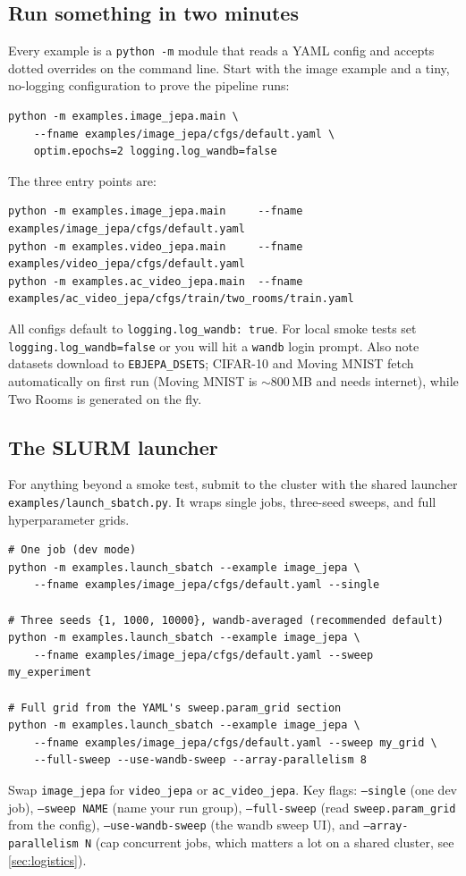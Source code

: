 \documentclass{article}
\newcommand{\code}[1]{\texttt{\small #1}}
\newcommand{\file}[1]{\texttt{\small #1}}
\begin{document}
\subsection{Run something in two minutes}

Every example is a \code{python -m} module that reads a YAML config and accepts
dotted overrides on the command line. Start with the image example and a tiny,
no-logging configuration to prove the pipeline runs:
\begin{lstlisting}[style=bash]
python -m examples.image_jepa.main \
    --fname examples/image_jepa/cfgs/default.yaml \
    optim.epochs=2 logging.log_wandb=false
\end{lstlisting}
The three entry points are:
\begin{lstlisting}[style=bash]
python -m examples.image_jepa.main     --fname examples/image_jepa/cfgs/default.yaml
python -m examples.video_jepa.main     --fname examples/video_jepa/cfgs/default.yaml
python -m examples.ac_video_jepa.main  --fname examples/ac_video_jepa/cfgs/train/two_rooms/train.yaml
\end{lstlisting}

\begin{gotchabox}
All configs default to \code{logging.log\_wandb: true}. For local smoke tests set
\code{logging.log\_wandb=false} or you will hit a \code{wandb} login prompt. Also
note datasets download to \code{EBJEPA\_DSETS}; CIFAR-10 and Moving MNIST fetch
automatically on first run (Moving MNIST is $\sim$800\,MB and needs internet),
while Two Rooms is generated on the fly.
\end{gotchabox}

\subsection{The SLURM launcher}

For anything beyond a smoke test, submit to the cluster with the shared launcher
\file{examples/launch\_sbatch.py}. It wraps single jobs, three-seed sweeps, and
full hyperparameter grids.
\begin{lstlisting}[style=bash]
# One job (dev mode)
python -m examples.launch_sbatch --example image_jepa \
    --fname examples/image_jepa/cfgs/default.yaml --single

# Three seeds {1, 1000, 10000}, wandb-averaged (recommended default)
python -m examples.launch_sbatch --example image_jepa \
    --fname examples/image_jepa/cfgs/default.yaml --sweep my_experiment

# Full grid from the YAML's sweep.param_grid section
python -m examples.launch_sbatch --example image_jepa \
    --fname examples/image_jepa/cfgs/default.yaml --sweep my_grid \
    --full-sweep --use-wandb-sweep --array-parallelism 8
\end{lstlisting}
Swap \code{image\_jepa} for \code{video\_jepa} or \code{ac\_video\_jepa}. Key
flags: \code{--single} (one dev job), \code{--sweep NAME} (name your run group),
\code{--full-sweep} (read \code{sweep.param\_grid} from the config),
\code{--use-wandb-sweep} (the wandb sweep UI), and \code{--array-parallelism N}
(cap concurrent jobs, which matters a lot on a shared cluster, see
\cref{sec:logistics}).
\end{document}
